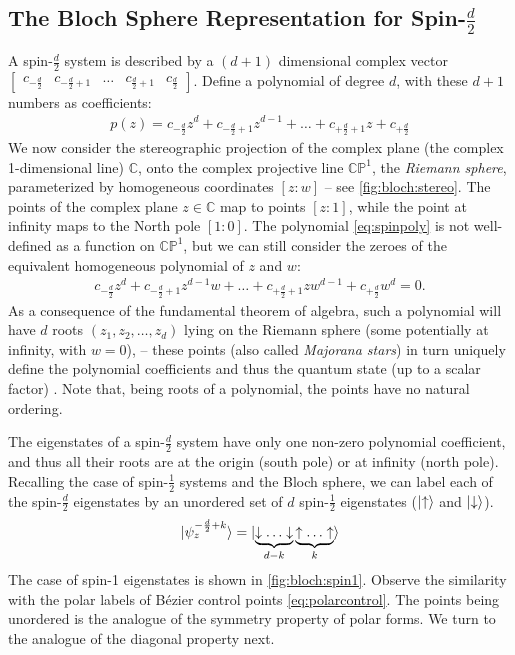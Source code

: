 \documentclass[final,3p,mathptmx]{elsarticle}
\begin{document}
\subsection{The Bloch Sphere Representation for Spin-$\frac{d}{2}$}\label{sec:spinfacts:majorana}
A spin-$\frac{d}{2}$ system is described by a $(d+1)$ dimensional complex vector 
$\begin{bmatrix}
	c_{-{\frac{d}{2}}} & c_{-{\frac{d}{2}} + 1} & \ldots & c_{{\frac{d}{2}} + 1} & c_{{\frac{d}{2}}}
\end{bmatrix}$. 
Define a polynomial of degree $d$, with these $d+1$ numbers as coefficients:
\begin{align}\label{eq:spinpoly}
p(z) = c_{-{\frac{d}{2}}}z^{d} + c_{-{\frac{d}{2}}+1}z^{d-1} + \ldots +  c_{+{\frac{d}{2}}+1}z + c_{+\frac{d}{2}}
\end{align}
We now consider the stereographic projection of the complex plane (the complex 1-dimensional line) $\mathbb{C}$, onto the complex projective line $\mathbb{CP}^{1}$, the \emph{Riemann sphere}, parameterized by homogeneous coordinates $[z:w]$ -- see \autoref{fig:bloch:stereo}. The points of the complex plane $z \in \mathbb{C}$ map to points $\left[z : 1 \right]$, while the point at infinity maps to the North pole $[1 : 0]$. The polynomial \eqref{eq:spinpoly} is not  well-defined as a function on $\mathbb{CP}^{1}$, but we can still consider the zeroes of the equivalent homogeneous polynomial of $z$ and $w$:
\begin{align}\label{eq:spinhompoly}
c_{-{\frac{d}{2}}}z^{d} + c_{-{\frac{d}{2}}+1}z^{d-1}w + \ldots +  c_{+{\frac{d}{2}}+1}zw^{d-1} + c_{+\frac{d}{2}}w^{d} = 0.
\end{align}
As a consequence of the fundamental theorem of algebra, such a polynomial will have $d$ roots $(z_{1}, z_{2}, \ldots, z_{d})$ lying on the Riemann sphere (some potentially at infinity, with $w = 0$), -- these points (also called \emph{Majorana stars}) in turn uniquely define the polynomial coefficients and thus the quantum state (up to a scalar factor) \cite[Ch. 22.10]{penrose2006road}. Note that, being roots of a polynomial, the points have no natural ordering.

The eigenstates of a spin-$\frac{d}{2}$ system have only one non-zero polynomial coefficient, and thus all their roots are at the origin (south pole) or at infinity (north pole). Recalling the case of spin-$\frac{1}{2}$ systems and the Bloch sphere, we can label each of the spin-$\frac{d}{2}$ eigenstates by an unordered set of $d$ spin-$\frac{1}{2}$ eigenstates ($\ket{\uparrow}$ and $\ket{\downarrow}$).
\begin{align}
\ket{\psi_{z}^{-\frac{d}{2} + k}}  = \ket{\underbrace{\downarrow \ldots \downarrow}_{d-k}\underbrace{\uparrow \ldots \uparrow}_{k}}
\end{align}
The case of spin-1 eigenstates is shown in \autoref{fig:bloch:spin1}. Observe the similarity with the polar labels of B\'{e}zier control points \eqref{eq:polarcontrol}. The points being unordered is the analogue of the symmetry property of polar forms. We turn to the analogue of the diagonal property next.
\end{document}
